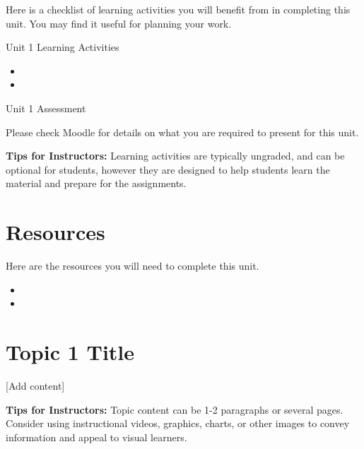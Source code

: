 \documentclass[
]{book}
\providecommand{\tightlist}{%
  \setlength{\itemsep}{0pt}\setlength{\parskip}{0pt}}
\begin{document}
Here is a checklist of learning activities you will benefit from in completing this unit. You may find it useful for planning your work.

\begin{reflect}
{Unit 1 Learning Activities }

\begin{itemize}
\tightlist
\item
\item
\end{itemize}
\end{reflect}

\begin{assessment}
{Unit 1 Assessment}

Please check Moodle for details on what you are required to present for this unit.
\end{assessment}

\begin{feedback}
\textbf{Tips for Instructors:}
Learning activities are typically ungraded, and can be optional for students, however they are designed to help students learn the material and prepare for the assignments.
\end{feedback}

\hypertarget{resources-5}{%
\section*{Resources}\label{resources-5}}

Here are the resources you will need to complete this unit.

\begin{itemize}
\tightlist
\item
\item
\end{itemize}

\hypertarget{topic-1-title}{%
\section{Topic 1 Title}\label{topic-1-title}}

{[}Add content{]}

\begin{feedback}
\textbf{Tips for Instructors:} Topic content can be 1-2 paragraphs or several pages. Consider using instructional videos, graphics, charts, or other images to convey information and appeal to visual learners.
\end{feedback}
\end{document}
